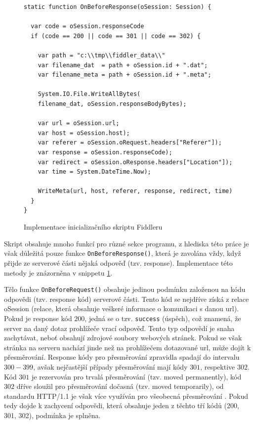 \documentclass[thesis=M,czech,hidelinks]{FITthesis}[2013/05/06]
\begin{document}
\begin{figure}[h]               
	\begin{verbatim}
static function OnBeforeResponse(oSession: Session) {
	
  var code = oSession.responseCode
  if (code == 200 || code == 301 || code == 302) {
	
    var path = "c:\\tmp\\fiddler_data\\"
    var filename_dat  = path + oSession.id + ".dat";
    var filename_meta = path + oSession.id + ".meta";
	
    System.IO.File.WriteAllBytes(
    filename_dat, oSession.responseBodyBytes);
	
    var url = oSession.url;
    var host = oSession.host);
    var referer = oSession.oRequest.headers["Referer"]);
    var response = oSession.responseCode);
    var redirect = oSession.oResponse.headers["Location"]);
    var time = System.DateTime.Now);
	
    WriteMeta(url, host, referer, response, redirect, time)
  }
}
	\end{verbatim}      
	\caption{Implementace inicializačního skriptu Fiddleru}
	\label{snip:fiddler}
\end{figure}

Skript obsahuje mnoho funkcí pro různé sekce programu, z hlediska této práce je však důležitá pouze funkce \texttt{OnBeforeResponse()}, která je zavolána vždy, když přijde ze serverové části nějaká odpověď (tzv. response). Implementace této metody je znázorněna v snippetu \ref{snip:fiddler}.

Tělo funkce \texttt{OnBeforeRequest()} obsahuje jedinou podmínku založenou na kódu odpovědi (tzv. response kód) serverové části. Tento kód se nejdříve získá z relace oSession (relace, která obsahuje veškeré informace o komunikaci s danou url). Pokud je response kód $200$, jedná se o tzv. \texttt{success} (úspěch), což znamená, že server na daný dotaz prohlížeče vrací odpověď. Tento typ odpovědí je snaha zachytávat, neboť obsahují zdrojové soubory webových stránek. Pokud se však stránka na serveru nachází jinde než na prohlížečem dotazované url, může dojít k přesměrování. Response kódy pro přesměrování zpravidla spadají do intervalu $300-399$, avšak nejčastější případy přesměrování mají kódy $301$, respektive $302$. Kód $301$ je rezervován pro trvalá přesměrování (tzv. moved permanently), kód $302$ dříve sloužil pro přesměrování dočasná (tzv. moved temporarily), od standardu HTTP/1.1 je však více využíván pro všeobecná přesměrování \cite{response_codes}. Pokud tedy dojde k zachycení odpovědi, která obsahuje jeden z těchto tří kódů (200, 301, 302), podmínka je splněna.
\end{document}
